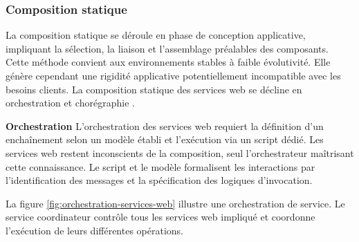 \subsubsection{Composition statique}
La composition statique se déroule en phase de conception applicative, impliquant la sélection, la liaison et l'assemblage préalables des composants. Cette méthode convient aux environnements stables à faible évolutivité. Elle génère cependant une rigidité applicative potentiellement incompatible avec les besoins clients. La composition statique des services web se décline en orchestration et chorégraphie \cite{peltz2003web}.

\textbf{Orchestration}
L'orchestration des services web requiert la définition d'un enchaînement selon un modèle établi et l'exécution via un script dédié. Les services web restent inconscients de la composition, seul l'orchestrateur maîtrisant cette connaissance. Le script et le modèle formalisent les interactions par l'identification des messages et la spécification des logiques d'invocation.

La figure \ref{fig:orchestration-services-web} illustre une orchestration de service. Le service coordinateur contrôle tous les services web impliqué et coordonne l’exécution de leurs différentes opérations. 

